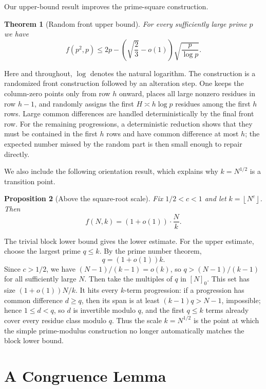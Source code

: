 \documentclass[10pt,a4paper]{amsart}
\newtheorem{theorem}{Theorem}[section]
\newtheorem{proposition}[theorem]{Proposition}
\newcommand{\floor}[1]{\left\lfloor #1\right\rfloor}
\numberwithin{equation}{section}
\begin{document}
Our upper-bound result improves the prime-square construction.

\begin{theorem}[Random front upper bound]\label{thm:upper}
For every sufficiently large prime $p$ we have
\[
        f(p^2,p)
        \le
        2p-\left(\sqrt{\frac23}-o(1)\right)\sqrt{\frac p{\log p}}.
\]
\end{theorem}

Here and throughout, $\log$ denotes the natural logarithm.
The construction is a randomized front construction followed by an alteration step.
One keeps the column-zero points only from row $h$ onward, places all large nonzero residues in row $h-1$, and randomly assigns the first $H\asymp h\log p$ residues among the first $h$ rows.
Large common differences are handled deterministically by the final front row.
For the remaining progressions, a deterministic reduction shows that they must be contained in the first $h$ rows and have common difference at most $h$; the expected number missed by the random part is then small enough to repair directly.

We also include the following orientation result, which explains why $k= N^{1/2}$ is a transition point.

\begin{proposition}[Above the square-root scale]\label{prop:above-root}
Fix $1/2<c<1$ and let $k=\floor{N^c}$.
Then
\[
        f(N,k)=(1+o(1))\cdot\frac Nk.
\]
\end{proposition}

The trivial block lower bound gives the lower estimate.
For the upper estimate, choose the largest prime $q\le k$.
By the prime number theorem,
\[
        q=(1+o(1))k.
\]
Since $c>1/2$, we have $(N-1)/(k-1)=o(k)$, so $q>(N-1)/(k-1)$ for all sufficiently large $N$.
Then take the multiples of $q$ in $[N]_0$.
This set has size $(1+o(1))N/k$.
It hits every $k$-term progression: if a progression has common difference $d\ge q$, then its span is at least $(k-1)q>N-1$, impossible; hence $1\le d<q$, so $d$ is invertible modulo $q$, and the first $q\le k$ terms already cover every residue class modulo $q$.
Thus the scale $k=N^{1/2}$ is the point at which the simple prime-modulus construction no longer automatically matches the block lower bound.

\section{A Congruence Lemma}
\end{document}
